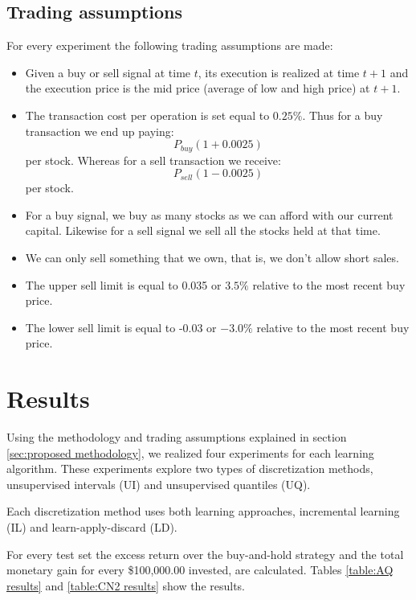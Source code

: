 \documentclass[preprint,3p,twocolumn]{elsarticle}
\begin{document}
\subsection{Trading assumptions}
\label{subsec:trading-assumptions}
For every experiment the following trading assumptions are made:

\begin{itemize}
\item Given a buy or sell signal at time $t$, its execution is realized at time $t+1$ and the execution price is the mid price (average of low and high price) at $t+1$.

\item The transaction cost per operation is set equal to $0.25\%$. Thus for a buy transaction we end up paying:
$$ P_{buy} (1 + 0.0025)$$
per stock. Whereas for a sell transaction we receive:
$$ P_{sell} (1 - 0.0025)$$ 
per stock.

\item For a buy signal, we buy as many stocks as we can afford with our current capital. Likewise for a sell signal we sell all the stocks held at that time.

\item We can only sell something that we own, that is, we don't allow short sales.

\item The upper sell limit is equal to 0.035 or $3.5\%$ relative to the most recent buy price.

\item The lower sell limit is equal to -0.03 or $-3.0\%$ relative to the most recent buy price.

\end{itemize}


\section{Results}
\label{sec:results}
Using the methodology and trading assumptions explained in section \ref{sec:proposed methodology}, we realized four experiments for each learning algorithm. These experiments explore two types of discretization methods, unsupervised intervals (UI) and unsupervised quantiles (UQ).

Each discretization method uses both learning approaches, incremental learning (IL) and learn-apply-discard (LD).

For every test set the excess return over the buy-and-hold strategy and the total monetary gain for every \$100,000.00 invested, are calculated. Tables \ref{table:AQ results} and \ref{table:CN2 results} show the results.
\end{document}
